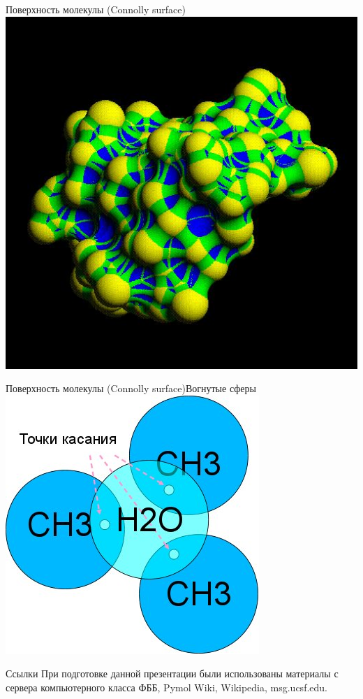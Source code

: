\documentclass{beamer}
\begin{document}
    \begin{frame}{Поверхность молекулы (Connolly surface)}
        \includegraphics[width=\linewidth]{connolly-types.jpg}
    \end{frame}

    \begin{frame}{Поверхность молекулы (Connolly surface)}{Вогнутые сферы}
        \includegraphics[width=\linewidth]{connolly-3-points.jpg}
    \end{frame}

    \begin{frame}{Ссылки}
        При подготовке данной презентации были использованы материалы с
        сервера компьютерного класса ФББ, Pymol Wiki, Wikipedia, msg.ucsf.edu.
    \end{frame}
\end{document}
